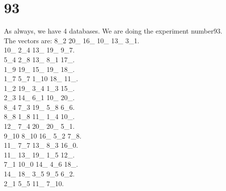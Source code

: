 \chapter{93}
\indent As always, we have 4 databases. We are doing the experiment number93.\\
The vectors are:
8\_2 20\_ 16\_ 10\_ 13\_ 3\_1.\\10\_ 2\_4 13\_ 19\_ 9\_7.\\5\_4 2\_8 13\_ 8\_1 17\_.\\1\_9 19\_ 15\_ 19\_ 18\_.\\1\_7 5\_7 1\_10 18\_ 11\_.\\1\_2 19\_ 3\_4 1\_3 15\_.\\2\_3 14\_ 6\_1 10\_ 20\_.\\8\_4 7\_3 19\_ 5\_8 6\_6.\\8\_8 1\_8 11\_ 1\_4 10\_.\\12\_ 7\_4 20\_ 20\_ 5\_1.\\9\_10 8\_10 16\_ 5\_2 7\_8.\\11\_ 7\_7 13\_ 8\_3 16\_0.\\11\_ 13\_ 19\_ 1\_5 12\_.\\7\_1 10\_0 14\_ 4\_6 18\_.\\14\_ 18\_ 3\_5 9\_5 6\_2.\\2\_1 5\_5 11\_ 7\_10.\\
